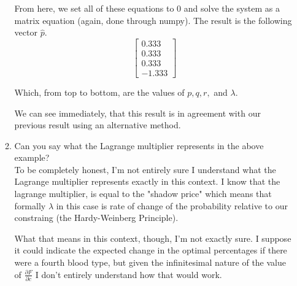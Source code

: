 \documentclass[11pt]{article}
\begin{document}
\begin{enumerate}
\begin{enumerate}
    From here, we set all of these equations to 0 and solve the system as a
    matrix equation (again, done through numpy). The result is the following
    vector $\hat{p}$.
    \[
    \begin{bmatrix}
        0.333 \\
        0.333 \\
        0.333 \\
        -1.333
    \end{bmatrix}
    \]

    Which, from top to bottom, are the values of $p, q, r,$ and $\lambda$.
    
    We can see immediately, that this result is in agreement with our previous
    result using an alternative method.

    \item Can you say what the Lagrange multiplier represents in the above
        example?\\

    To be completely honest, I'm not entirely sure I understand what the
    Lagrange multiplier represents exactly in this context. I know that the
    lagrange multiplier, is equal to the "shadow price" which means that
    formally $\lambda$ in this case is rate of change of the probability
    relative to our constraing (the Hardy-Weinberg Principle).

    What that means in this context, though, I'm not exactly sure. I suppose it
    could indicate the expected change in the optimal percentages if there were
    a fourth blood type, but given the infinitesimal nature of the value of
    $\frac{\partial F}{\partial c}$ I don't entirely understand how that would
    work.
    


\end{enumerate}







\end{enumerate}
\end{document}

